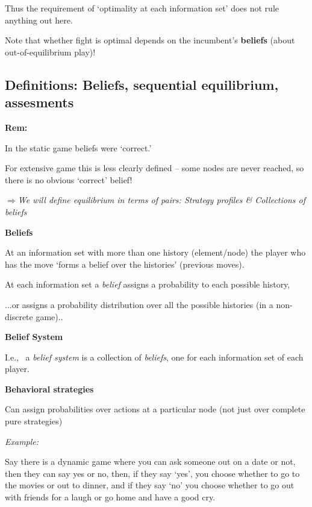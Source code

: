 \documentclass{article}
\begin{document}
Thus the requirement of `optimality at each information set' does not rule
anything out here.

\bigskip

Note that whether fight is optimal depends on the incumbent's \textbf{%
beliefs }(about out-of-equilibrium play)!

\bigskip

\subsection{Definitions: Beliefs, sequential equilibrium, assesments}

\textbf{Rem: }

\bigskip

In the static game beliefs were `correct.'

\bigskip

For extensive game this is less clearly defined -- some nodes are never
reached, so there is no obvious `correct' belief!

\bigskip

$\mathbf{\Longrightarrow }$\textit{We will define equilibrium in terms of
pairs: Strategy profiles \& Collections of beliefs }

\bigskip

\textbf{Beliefs }

At an information set with more than one history (element/node) the player
who has the move `forms a belief over the histories' (previous moves).

At each information set a \textit{belief }assigns a probability to each
possible history,

...or assigns a probability distribution over all the possible histories (in
a non-discrete game)..

\bigskip

\textbf{Belief System}

I.e., \ a \textit{belief system }is a collection of \textit{beliefs}, one
for each information set of each player.

\bigskip

\textbf{Behavioral strategies}

Can assign probabilities over actions at a particular node (not just over
complete pure strategies)

\bigskip

\emph{Example:}

Say there is a dynamic game where you can ask someone out on a date or not,
then they can say yes or no, then, if they say `yes', you choose whether to
go to the movies or out to dinner, and if they say `no' you choose whether
to go out with friends for a laugh or go home and have a good cry.
\end{document}
